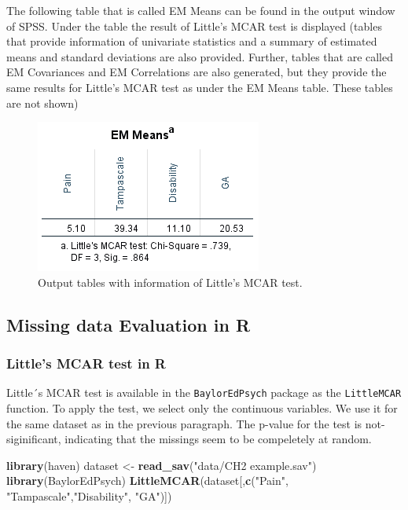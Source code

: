 \documentclass[]{book}
\newenvironment{Shaded}{\begin{snugshade}}{\end{snugshade}}
\newcommand{\KeywordTok}[1]{\textcolor[rgb]{0.13,0.29,0.53}{\textbf{#1}}}
\newcommand{\StringTok}[1]{\textcolor[rgb]{0.31,0.60,0.02}{#1}}
\newcommand{\NormalTok}[1]{#1}
\begin{document}
The following table that is called EM Means can be found in the output
window of SPSS. Under the table the result of Little's MCAR test is
displayed (tables that provide information of univariate statistics and
a summary of estimated means and standard deviations are also provided.
Further, tables that are called EM Covariances and EM Correlations are
also generated, but they provide the same results for Little's MCAR test
as under the EM Means table. These tables are not shown)

\begin{figure}

{\centering \includegraphics[width=0.6\linewidth]{images/tab2.7c} 

}

\caption{Output tables with information of Little’s MCAR test.}\label{fig:tab2-7}
\end{figure}

\subsection{Missing data Evaluation in
R}\label{missing-data-evaluation-in-r}

\subsubsection{Little's MCAR test in R}\label{littles-mcar-test-in-r}

Little´s MCAR test is available in the \texttt{BaylorEdPsych} package as
the \texttt{LittleMCAR} function. To apply the test, we select only the
continuous variables. We use it for the same dataset as in the previous
paragraph. The p-value for the test is not-siginificant, indicating that
the missings seem to be compeletely at random.

\begin{Shaded}
\begin{Highlighting}[]
\KeywordTok{library}\NormalTok{(haven)}
\NormalTok{dataset <-}\StringTok{ }\KeywordTok{read_sav}\NormalTok{(}\StringTok{"data/CH2 example.sav"}\NormalTok{)}
\KeywordTok{library}\NormalTok{(BaylorEdPsych)}
\KeywordTok{LittleMCAR}\NormalTok{(dataset[,}\KeywordTok{c}\NormalTok{(}\StringTok{"Pain"}\NormalTok{, }\StringTok{"Tampascale"}\NormalTok{,}\StringTok{"Disability"}\NormalTok{, }\StringTok{"GA"}\NormalTok{)])}
\end{Highlighting}
\end{Shaded}
\end{document}
